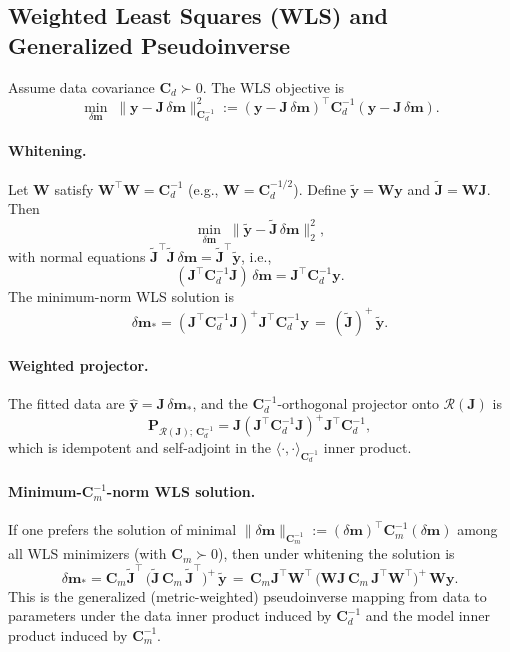 \documentclass[11pt,a4paper]{article}
\begin{document}
\subsection{Weighted Least Squares (WLS) and Generalized Pseudoinverse}\label{subsec:wls}
Assume data covariance $\mathbf{C}_d \succ 0$. The WLS objective is
\[
\min_{\delta\mathbf{m}}\; \|\mathbf{y}-\mathbf{J}\,\delta\mathbf{m}\|_{\mathbf{C}_d^{-1}}^2 := (\mathbf{y}-\mathbf{J}\,\delta\mathbf{m})^\top \mathbf{C}_d^{-1} (\mathbf{y}-\mathbf{J}\,\delta\mathbf{m}).
\]
\paragraph{Whitening.} Let $\mathbf{W}$ satisfy $\mathbf{W}^\top\mathbf{W}=\mathbf{C}_d^{-1}$ (e.g., $\mathbf{W}=\mathbf{C}_d^{-1/2}$). Define $\tilde{\mathbf{y}}=\mathbf{W}\mathbf{y}$ and $\tilde{\mathbf{J}}=\mathbf{W}\mathbf{J}$. Then
\[
\min_{\delta\mathbf{m}} \; \|\tilde{\mathbf{y}}-\tilde{\mathbf{J}}\,\delta\mathbf{m}\|_2^2,
\]
with normal equations $\tilde{\mathbf{J}}^\top\tilde{\mathbf{J}}\,\delta\mathbf{m}=\tilde{\mathbf{J}}^\top \tilde{\mathbf{y}}$, i.e.,
\[
(\mathbf{J}^\top \mathbf{C}_d^{-1} \mathbf{J})\,\delta\mathbf{m} = \mathbf{J}^\top \mathbf{C}_d^{-1} \mathbf{y}.
\]
The minimum-norm WLS solution is
\[
\delta\mathbf{m}_\ast = (\mathbf{J}^\top \mathbf{C}_d^{-1} \mathbf{J})^{+} \mathbf{J}^\top \mathbf{C}_d^{-1} \mathbf{y} \,=\, (\tilde{\mathbf{J}})^{+}\,\tilde{\mathbf{y}}.
\]
\paragraph{Weighted projector.} The fitted data are $\widehat{\mathbf{y}}=\mathbf{J}\,\delta\mathbf{m}_\ast$, and the $\mathbf{C}_d^{-1}$-orthogonal projector onto $\mathcal{R}(\mathbf{J})$ is
\[
\mathbf{P}_{\mathcal{R}(\mathbf{J});\,\mathbf{C}_d^{-1}} = \mathbf{J} (\mathbf{J}^\top \mathbf{C}_d^{-1} \mathbf{J})^{+} \mathbf{J}^\top \mathbf{C}_d^{-1},
\]
which is idempotent and self-adjoint in the $\langle\cdot,\cdot\rangle_{\mathbf{C}_d^{-1}}$ inner product.

\paragraph{Minimum-\(\mathbf{C}_m^{-1}\)-norm WLS solution.} If one prefers the solution of minimal $\|\delta\mathbf{m}\|_{\mathbf{C}_m^{-1}} := (\delta\mathbf{m})^\top \mathbf{C}_m^{-1} (\delta\mathbf{m})$ among all WLS minimizers (with $\mathbf{C}_m\succ 0$), then under whitening the solution is
\[
\delta\mathbf{m}_\ast = \mathbf{C}_m \tilde{\mathbf{J}}^\top\,\big(\tilde{\mathbf{J}}\,\mathbf{C}_m\,\tilde{\mathbf{J}}^\top\big)^{+}\,\tilde{\mathbf{y}} \,=\, \mathbf{C}_m \mathbf{J}^\top \mathbf{W}^\top\,\big(\mathbf{W}\mathbf{J}\,\mathbf{C}_m\,\mathbf{J}^\top\mathbf{W}^\top\big)^{+}\,\mathbf{W}\mathbf{y}.
\]
This is the generalized (metric-weighted) pseudoinverse mapping from data to parameters under the data inner product induced by $\mathbf{C}_d^{-1}$ and the model inner product induced by $\mathbf{C}_m^{-1}$.
\end{document}
